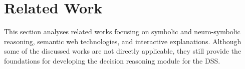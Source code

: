 \section{Related Work}\label{chapter_8:rw}
This section analyses related works focusing on symbolic and neuro-symbolic reasoning, semantic web technologies, and interactive explanations. Although some of the discussed works are not directly applicable, they still provide the foundations for developing the decision reasoning module for the DSS.

